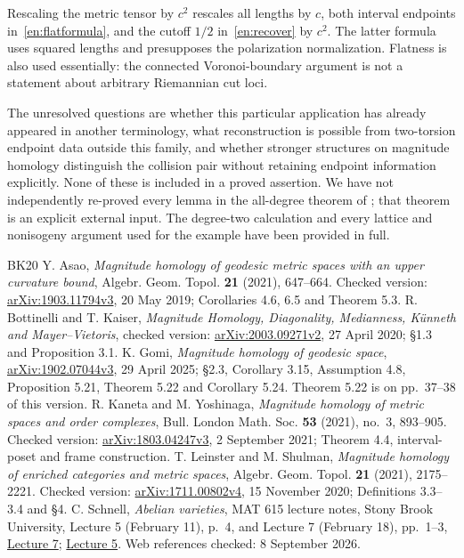 \documentclass[12pt]{amsart}
\theoremstyle{definition}
\theoremstyle{remark}
\numberwithin{equation}{section}
\begin{document}
Rescaling the metric tensor by $c^2$ rescales all lengths by $c$, both interval endpoints in~\eqref{en:flatformula}, and the cutoff $1/2$ in~\eqref{en:recover} by $c^2$. The latter formula uses squared lengths and presupposes the polarization normalization. Flatness is also used essentially: the connected Voronoi-boundary argument is not a statement about arbitrary Riemannian cut loci.

The unresolved questions are whether this particular application has already appeared in another terminology, what reconstruction is possible from two-torsion endpoint data outside this family, and whether stronger structures on magnitude homology distinguish the collision pair without retaining endpoint information explicitly. None of these is included in a proved assertion. We have not independently re-proved every lemma in the all-degree theorem of \cite{en:G}; that theorem is an explicit external input. The degree-two calculation and every lattice and nonisogeny argument used for the example have been provided in full.

\begin{thebibliography}{BK20}
 Y. Asao, \emph{Magnitude homology of geodesic metric spaces with an upper curvature bound}, Algebr. Geom. Topol. \textbf{21} (2021), 647--664. Checked version: \href{https://arxiv.org/abs/1903.11794v3}{arXiv:1903.11794v3}, 20 May 2019; Corollaries 4.6, 6.5 and Theorem 5.3.
 R. Bottinelli and T. Kaiser, \emph{Magnitude Homology, Diagonality, Medianness, K\"unneth and Mayer--Vietoris}, checked version: \href{https://arxiv.org/abs/2003.09271v2}{arXiv:2003.09271v2}, 27 April 2020; \S1.3 and Proposition 3.1.
 K. Gomi, \emph{Magnitude homology of geodesic space}, \href{https://arxiv.org/abs/1902.07044v3}{arXiv:1902.07044v3}, 29 April 2025; \S2.3, Corollary 3.15, Assumption 4.8, Proposition 5.21, Theorem 5.22 and Corollary 5.24. Theorem 5.22 is on pp.~37--38 of this version.
 R. Kaneta and M. Yoshinaga, \emph{Magnitude homology of metric spaces and order complexes}, Bull. London Math. Soc. \textbf{53} (2021), no.~3, 893--905. Checked version: \href{https://arxiv.org/abs/1803.04247v3}{arXiv:1803.04247v3}, 2 September 2021; Theorem 4.4, interval-poset and frame construction.
 T. Leinster and M. Shulman, \emph{Magnitude homology of enriched categories and metric spaces}, Algebr. Geom. Topol. \textbf{21} (2021), 2175--2221. Checked version: \href{https://arxiv.org/abs/1711.00802v4}{arXiv:1711.00802v4}, 15 November 2020; Definitions 3.3--3.4 and \S4.
 C. Schnell, \emph{Abelian varieties}, MAT 615 lecture notes, Stony Brook University, Lecture 5 (February 11), p.~4, and Lecture 7 (February 18), pp.~1--3, \href{https://www.math.stonybrook.edu/~cschnell/mat615/lectures/lecture7.pdf}{Lecture 7}; \href{https://www.math.stonybrook.edu/~cschnell/mat615/lectures/lecture5.pdf}{Lecture 5}. Web references checked: 8 September 2026.
\end{thebibliography}
\end{document}
